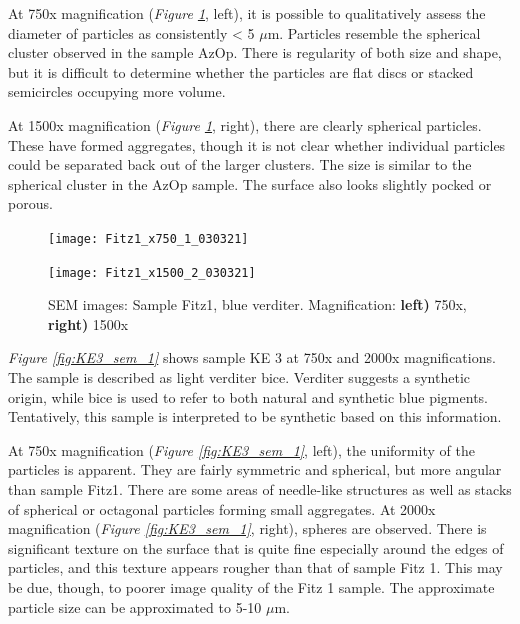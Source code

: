 At 750x magnification (\textit{Figure \ref{fig:Fitz1_sem_1}}, left), it is possible to qualitatively assess the diameter of particles as consistently < 5 $\mu$m. Particles resemble the spherical cluster observed in the sample AzOp. There is regularity of both size and shape, but it is difficult to determine whether the particles are flat discs or stacked semicircles occupying more volume.

At 1500x magnification (\textit{Figure \ref{fig:Fitz1_sem_1}}, right), there are clearly spherical particles. These have formed aggregates, though it is not clear whether individual particles could be separated back out of the larger clusters. The size is similar to the spherical cluster in the AzOp sample. The surface also looks slightly pocked or porous. 

\begin{figure}[H]
\centering
\begin{minipage}{.45\textwidth}
  \centering
  \texttt{[image: Fitz1\_x750\_1\_030321]}
\end{minipage}
\begin{minipage}{.45\textwidth}
  \centering
  \texttt{[image: Fitz1\_x1500\_2\_030321]}
\end{minipage}
\caption[SEM images: Sample Fitz1, blue verditer]{SEM images: Sample Fitz1, blue verditer. Magnification: \textbf{left)} 750x, \textbf{right)} 1500x}
\label{fig:Fitz1_sem_1}
\end{figure}



\textit{Figure \ref{fig:KE3_sem_1}} shows sample KE 3 at 750x and 2000x magnifications. The sample is described as light verditer bice. Verditer suggests a synthetic origin, while bice is used to refer to both natural and synthetic blue pigments. Tentatively, this sample is interpreted to be synthetic based on this information.

At 750x magnification (\textit{Figure \ref{fig:KE3_sem_1}}, left), the uniformity of the particles is apparent. They are fairly symmetric and spherical, but more angular than sample Fitz1. There are some areas of needle-like structures as well as stacks of spherical or octagonal particles forming small aggregates. At 2000x magnification (\textit{Figure \ref{fig:KE3_sem_1}}, right), spheres are observed. There is significant texture on the surface that is quite fine especially around the edges of particles, and this texture appears rougher than that of sample Fitz 1. This may be due, though, to poorer image quality of the Fitz 1 sample. The approximate particle size can be approximated to 5-10 $\mu$m.

